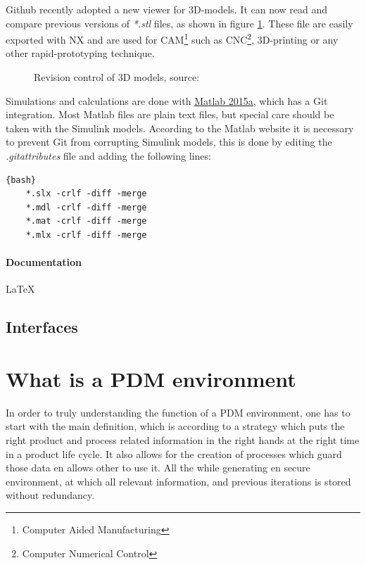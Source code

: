 \documentclass[fleqn,10pt]{SelfArx} %
\begin{document}
Github recently adopted a new viewer for 3D-models. It can now read and compare previous versions of \textit{*.stl} files, as shown in figure \ref{fig:view}. These file are easily exported with NX and are used for CAM\footnote{Computer Aided Manufacturing} such as CNC\footnote{Computer Numerical Control}, 3D-printing or any other rapid-prototyping technique.

\begin{figure}[ht]\centering 
	\caption{Revision control of 3D models, source: \citeauthor{skalnik_3d_2013}\cite{skalnik_3d_2013}}
	\label{fig:view}
\end{figure}

Simulations and calculations are done with \href{http://nl.mathworks.com/products/matlab/}{\color{color1}Matlab 2015a}, which has a Git integration. Most Matlab files are plain text files, but special care should be taken with the Simulink models. According to the Matlab website it is necessary to prevent Git from corrupting Simulink models, this is done by editing the \textit{.gitattributes} file and adding the following lines: 
\begin{lstlisting}{bash}
	*.slx -crlf -diff -merge
	*.mdl -crlf -diff -merge
	*.mat -crlf -diff -merge
	*.mlx -crlf -diff -merge
\end{lstlisting}

\paragraph{Documentation}
\LaTeX 


\subsection{Interfaces}\label{sec:Interfaces}


\section{What is a PDM environment}
In order to truly understanding the function of a PDM environment, one has to start with the main definition, which is according to \citeauthor{la_product_2009} \cite{la_product_2009} a strategy which puts the right product and process related information in the right hands at the right time in a product life cycle. It also allows for the creation of processes which guard those data en allows other to use it. All the while generating en secure environment, at which all relevant information, and previous iterations is stored without redundancy.
\end{document}
